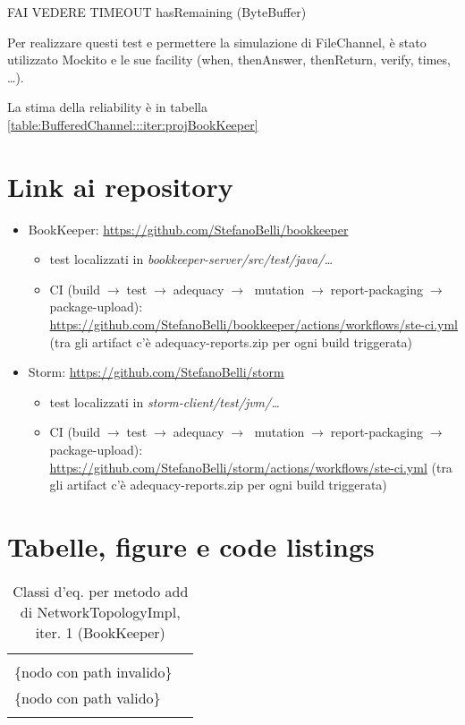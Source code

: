 \documentclass[10pt, a4paper]{article}
\newcommand{\Intmaketable}[4]{
	\begin{longtable}{#3}
	#4
	\caption{#2}
	\label{#1}
	\end{longtable}
}
\newcommand{\Intceqtable}[3]{
	\Intmaketable{#1}{#2}{|l|l|}{
	\hline
	\thead{Parametro formale} & \thead{Classi d'equivalenza} \\
	\hline
	\hline
	#3
	\hline}
}
\newcommand{\Intceqcaption}[4]{Classi d'eq. per metodo #1 di #2, iter. #3 (#4)}
\newcommand{\gettablelabel}[5]{table:#1:#2:#3:iter#4:proj#5}
\newcommand{\getreltablelabel}[2]{\gettablelabel{#1}{}{}{}{#2}}
\newcommand{\ceqtable}[5]{
	\Intceqtable{\gettablelabel{ceq}{#1}{#2}{#3}{#4}}
		{\Intceqcaption{#1}{#2}{#3}{#4}}
		{#5}
}
\newcommand{\tcell}{\makecell[tl]}
\newcommand{\newtrow}{\\ \hline}
\def\bookkeeper{BookKeeper}
\newcommand{\ceq}[1]{\{#1\}}
\begin{document}
	FAI VEDERE TIMEOUT hasRemaining (ByteBuffer)
	
	Per realizzare questi test e permettere la simulazione di FileChannel, è stato utilizzato Mockito e le
	sue facility (when, thenAnswer, thenReturn, verify, times, \dots).
	
	La stima della reliability è in tabella \ref{\getreltablelabel{BufferedChannel}{\bookkeeper}}

	\newpage
	\section{Link ai repository}
	\begin{itemize}
		\item BookKeeper: \url{https://github.com/StefanoBelli/bookkeeper}
		\begin{itemize}
			\item test localizzati in \textit{bookkeeper-server/src/test/java/\dots}
			\item CI (build$\;\rightarrow\;$test$\;\rightarrow\;$adequacy$\;\rightarrow\;$
			mutation$\;\rightarrow\;$report-packaging$\;\rightarrow\;$package-upload): 
			\url{https://github.com/StefanoBelli/bookkeeper/actions/workflows/ste-ci.yml} 
			(tra gli artifact c'è adequacy-reports.zip per ogni build triggerata)
		\end{itemize}
		\item Storm: \url{https://github.com/StefanoBelli/storm}
		\begin{itemize}
			\item test localizzati in \textit{storm-client/test/jvm/\dots}
			\item CI (build$\;\rightarrow\;$test$\;\rightarrow\;$adequacy$\;\rightarrow\;$
			mutation$\;\rightarrow\;$report-packaging$\;\rightarrow\;$package-upload): 
			\url{https://github.com/StefanoBelli/storm/actions/workflows/ste-ci.yml}
			(tra gli artifact c'è adequacy-reports.zip per ogni build triggerata)
		\end{itemize}
	\end{itemize}
	
	\newpage
	\section{Tabelle, figure e code listings}
	
	
	\ceqtable{add}{NetworkTopologyImpl}{1}{\bookkeeper}{
			\tcell{node} & \tcell{\ceq{null} \\ \ceq{nodo con path invalido} \\ \ceq{nodo con path valido} }
		\newtrow
	}
	
\end{document}

